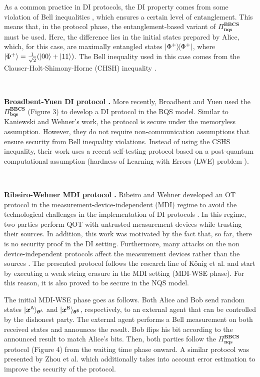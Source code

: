 As a common practice in DI protocols, the DI property comes from some violation of Bell inequalities \cite{AGM06}, which ensures a certain level of entanglement. This means that, in the protocol phase, the entanglement-based variant of $\Pi^{\textbf{BBCS}}_{\textbf{nqs}}$ must be used. Here, the difference lies in the initial states prepared by Alice, which, for this case, are maximally entangled states $\ketbra{\Phi^+}$, where $| \Phi^+ \rangle = \frac{1}{\sqrt{2}}(| 00 \rangle + | 11 \rangle)$. The Bell inequality used in this case comes from the Clauser-Holt-Shimony-Horne (CHSH) inequality \cite{CHSH69}.


\

\noindent\textbf{Broadbent-Yuen DI protocol \cite{BY21}.} More recently, Broadbent and Yuen \cite{BY21} used the $\Pi^{\textbf{BBCS}}_{\textbf{bqs}}$ (Figure 3) to develop a DI protocol in the BQS model. Similar to Kaniewski and Wehner's work, the protocol is secure under the memoryless assumption. However, they do not require non-communication assumptions that ensure security from Bell inequality violations. Instead of using the CSHS inequality, their work uses a recent self-testing protocol \cite{MDC+21, MV21} based on a post-quantum computational assumption (hardness of Learning with Errors (LWE) problem \cite{P15}).

\

\noindent\textbf{Ribeiro-Wehner MDI protocol \cite{RW20}.} Ribeiro and Wehner \cite{RW20} developed an OT protocol in the measurement-device-independent (MDI) regime \cite{LCQ12} to avoid the technological challenges in the implementation of DI protocols \cite{MDR+19}. In this regime, two parties perform QOT with untrusted measurement devices while trusting their sources. In addition, this work was motivated by the fact that, so far, there is no security proof in the DI setting. Furthermore, many attacks on the non device-independent protocols affect the measurement devices rather than the sources \cite{SRK+15}. The presented protocol follows the research line of K\"onig et al. \cite{KWW12} and start by executing a weak string erasure in the MDI setting (MDI-WSE phase). For this reason, it is also proved to be secure in the NQS model.

The initial MDI-WSE phase goes as follows. Both Alice and Bob send random states $| \bm{x}^{\mathsf{A}} \rangle_{\bm{\theta}^{\mathsf{A}}}$ and $| \bm{x}^{\mathsf{B}} \rangle_{\bm{\theta}^{\mathsf{B}}}$, respectively, to an external agent that can be controlled by the dishonest party. The external agent performs a Bell measurement on both received states and announces the result. Bob flips his bit according to the announced result to match Alice's bits. Then, both parties follow the $\Pi^{\textbf{BBCS}}_{\textbf{nqs}}$ protocol (Figure 4) from the waiting time phase onward. A similar protocol was presented by Zhou et al. \cite{ZGG+20} which additionally takes into account error estimation to improve the security of the protocol.

